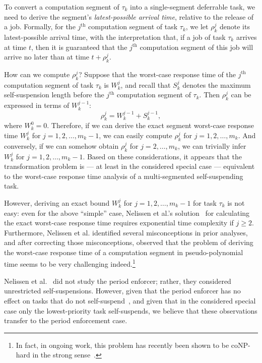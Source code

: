 To  convert a computation segment of $\tau_k$ into a single-segment deferrable task, we need to derive the segment's \emph{latest-possible arrival time}, relative to the release of a job. Formally,  for the $j^{\mathrm{th}}$ computation segment of task $\tau_k$, we let $\rho_k^j$ denote its latest-possible arrival time, with the interpretation that, if a job of task $\tau_k$ arrives at time $t$, then  it is guaranteed that the $j^{\mathrm{th}}$ computation segment of this job will arrive no later than at time $t+\rho_k^j$.

How can we compute $\rho_k^j$? Suppose that the worst-case response time of the $j^{\mathrm{th}}$ computation segment of task $\tau_k$ is $W_k^j$, and recall that $S_k^{j}$ denotes the maximum self-suspension length before the $j^{\mathrm{th}}$ computation segment of $\tau_k$. Then $\rho_k^j$ can be expressed in terms of $W_k^{j-1}$:
$$
	\rho_k^j = W_k^{j-1}+S_k^{j-1},
$$
where $W_k^0 = 0$.  Therefore, if we can derive the exact segment worst-case response time $W_k^j$ for $j=1,2,\ldots,m_k-1$, we can easily compute $\rho_k^j$  for $j=1,2,\ldots,m_k$. And conversely, if we can somehow obtain $\rho_k^j$  for $j=2,\ldots,m_k$, we  can trivially infer $W_k^j$ for $j=1,2,\ldots,m_k-1$.
Based on these considerations, it appears that the transformation problem is  --- at least in the considered special case --- equivalent to the  worst-case response time analysis of a multi-segmented self-suspending task. 

However, deriving an exact bound $W_k^j$ for $j=1,2,\ldots,m_k-1$ for task $\tau_k$ is not easy: 
even for the above ``simple'' case, Nelissen et al.'s solution~\cite{ecrts15nelissen} for calculating the exact worst-case response time requires exponential time complexity if $j \geq 2$. Furthermore, Nelissen et al. \cite{ecrts15nelissen} identified several misconceptions in prior analyses, and after correcting those misconceptions, observed that the problem of deriving the worst-case response time of a computation segment in pseudo-polynomial time seems to be very challenging indeed.\footnote{In fact, in ongoing work, this problem has recently been shown to be coNP-hard in the strong sense~\cite{Chen2016b}.}

Nelissen et al.~\cite{ecrts15nelissen} did not study the period enforcer; rather, they considered unrestricted self-suspensions. However, given that the period enforcer has no effect on tasks that do not self-suspend~\cite{Raj:suspension1991}, and given that in the considered special case only the lowest-priority task self-suspends, we believe that these observations transfer to the period enforcement case.

